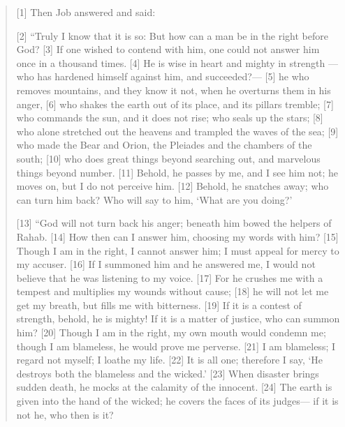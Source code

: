 \begin{quote}
    [1] Then Job answered and said:

    [2] “Truly I know that it is so:
        But how can a man be in the right before God?
    [3] If one wished to contend with him,
        one could not answer him once in a thousand times.
    [4] He is wise in heart and mighty in strength
        —who has hardened himself against him, and succeeded?—
    [5] he who removes mountains, and they know it not,
        when he overturns them in his anger,
    [6] who shakes the earth out of its place,
        and its pillars tremble;
    [7] who commands the sun, and it does not rise;
        who seals up the stars;
    [8] who alone stretched out the heavens
        and trampled the waves of the sea;
    [9] who made the Bear and Orion,
        the Pleiades and the chambers of the south;
    [10] who does great things beyond searching out,
        and marvelous things beyond number.
    [11] Behold, he passes by me, and I see him not;
        he moves on, but I do not perceive him.
    [12] Behold, he snatches away; who can turn him back?
        Who will say to him, ‘What are you doing?’


    [13] “God will not turn back his anger;
        beneath him bowed the helpers of Rahab.
    [14] How then can I answer him,
        choosing my words with him?
    [15] Though I am in the right, I cannot answer him;
        I must appeal for mercy to my accuser.
    [16] If I summoned him and he answered me,
        I would not believe that he was listening to my voice.
    [17] For he crushes me with a tempest
        and multiplies my wounds without cause;
    [18] he will not let me get my breath,
        but fills me with bitterness.
    [19] If it is a contest of strength, behold, he is mighty!
        If it is a matter of justice, who can summon him?
    [20] Though I am in the right, my own mouth would condemn me;
        though I am blameless, he would prove me perverse.
    [21] I am blameless; I regard not myself;
        I loathe my life.
    [22] It is all one; therefore I say,
        ‘He destroys both the blameless and the wicked.’
    [23] When disaster brings sudden death,
        he mocks at the calamity of the innocent.
    [24] The earth is given into the hand of the wicked;
        he covers the faces of its judges—
        if it is not he, who then is it?



\end{quote}

